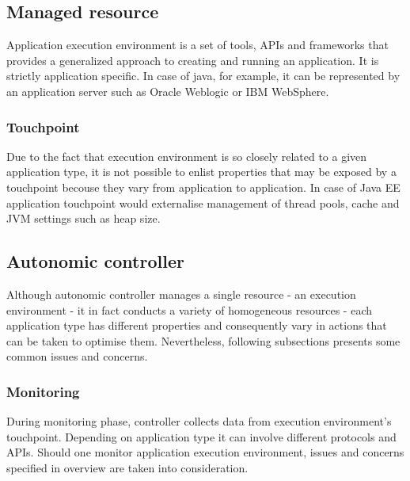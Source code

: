 \subsection{Managed resource}
Application execution environment is a set of tools, APIs and frameworks that provides a generalized approach to creating and running an application. It is strictly application specific. In case of java, for example, it can be represented by an application server such as Oracle Weblogic or IBM WebSphere. 

\subsubsection{Touchpoint}
Due to the fact that execution environment is so closely related to a given application type, it is not possible to enlist properties that may be exposed by a touchpoint becouse they vary from application to application. In case of Java EE application touchpoint would externalise management of thread pools, cache and JVM settings such as heap size.

\subsection{Autonomic controller}
Although autonomic controller manages a single resource - an execution environment - it in fact conducts a variety of homogeneous resources - each application type has different properties and consequently vary in actions that can be taken to optimise them. Nevertheless, following subsections presents some common issues and concerns.

\subsubsection{Monitoring}
During monitoring phase, controller collects data from execution environment's touchpoint. Depending on application type it can involve different protocols and APIs. Should one monitor application execution environment, issues and concerns specified in overview are taken into consideration.

